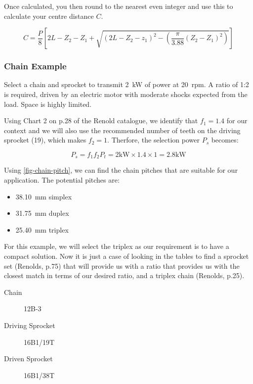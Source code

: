 Once calculated, you then round to the nearest even integer and use this to calculate your centre distance \(C\).

\begin{equation}
  C=\frac{P}{8}
  \left[
  2L-Z_2-Z_1 
  +
  \sqrt{ 
    {\left(2L-Z_2-z_1\right)}^2 - \left(\frac{\pi}{3.88}\left(Z_2-Z_1\right)^2\right)
  }
  \right]
\end{equation}

\subsubsection{Chain Example}

Select a chain and sprocket to transmit \SI{2}{\kilo\watt} of power at \SI{20}{rpm}. A ratio of 1:2 is required, driven by an electric motor with moderate shocks expected from the load. Space is highly limited.

Using Chart 2 on p.28 of the Renold catalogue, we identify that \(f_1=1.4\) for our context and we will also use the recommended number of teeth on the driving sprocket (19), which makes \(f_2=1\). Therfore, the selection power \(P_s\) becomes:

\begin{equation}
  P_s = f_1f_2P_t = 2\si{\kilo\watt}\times1.4\times1=2.8\si{\kilo\watt}
\end{equation}

Using \cref{fig-chain-pitch}, we can find the chain pitches that are suitable for our application. The potential pitches are:

\begin{itemize}
  \item \SI{38.10}{\milli\metre} simplex
  \item \SI{31.75}{\milli\metre} duplex
  \item \SI{25.40}{\milli\metre} triplex
\end{itemize}

For this example, we will select the triplex as our requirement is to have a compact solution. Now it is just a case of looking in the tables to find a sprocket set (Renolds, p.75) that will provide us with a ratio that provides us with the closest match in terms of our desired ratio, and a triplex chain (Renolds, p.25).

\begin{description}
  \item[Chain] 12B-3
  \item[Driving Sprocket] 16B1/19T
  \item[Driven Sprocket] 16B1/38T
\end{description}

